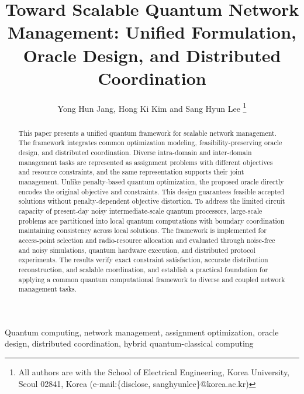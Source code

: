 \documentclass[journal]{IEEEtran}
\begin{document}
\title{Toward Scalable Quantum Network Management: Unified Formulation, Oracle Design, and Distributed Coordination}

\author{
Yong Hun Jang, Hong Ki Kim and Sang Hyun Lee
\thanks{
All authors are with the School of Electrical Engineering, Korea University, Seoul 02841, Korea (e-mail:\{disclose, sanghyunlee\}@korea.ac.kr)}
}

\maketitle

{\color{purple}
{\color{violet}
\begin{abstract}
This paper presents a unified quantum framework for scalable network management. The framework integrates common optimization modeling, feasibility-preserving oracle design, and distributed coordination. Diverse intra-domain and inter-domain management tasks are represented as assignment problems with different objectives and resource constraints, and the same representation supports their joint management. Unlike penalty-based quantum optimization, the proposed oracle directly encodes the original objective and constraints. This design guarantees feasible accepted solutions without penalty-dependent objective distortion. To address the limited circuit capacity of present-day noisy intermediate-scale quantum processors, large-scale problems are partitioned into local quantum computations with boundary coordination maintaining consistency across local solutions. The framework is implemented for access-point selection and radio-resource allocation and evaluated through noise-free and noisy simulations, quantum hardware execution, and distributed protocol experiments. The results verify exact constraint satisfaction, accurate distribution reconstruction, and scalable coordination, and establish a practical foundation for applying a common quantum computational framework to diverse and coupled network management tasks.
\end{abstract}
\begin{IEEEkeywords}
Quantum computing, network management, assignment optimization, oracle design, distributed coordination, hybrid quantum-classical computing
\end{IEEEkeywords}

}}
\end{document}
